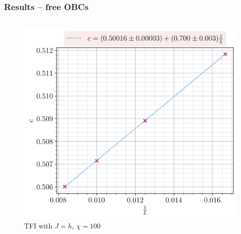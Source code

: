 \documentclass[10pt]{beamer}
\begin{document}
\begin{frame}
    \frametitle{Results -- free OBCs}

    \begin{columns}
        \begin{column}{0.57\linewidth}
            \begin{figure}
                \includegraphics[scale=0.43]{../../graphs/entropies/ff/calabrese_chi=100.0_J=1.0_h=1.0_i=1.0_3=0.0_c=0.0.png}
                \caption{TFI with $J=h$, $\chi=100$}
            \end{figure}
        \end{column}


\end{columns}
\end{frame}
\end{document}
